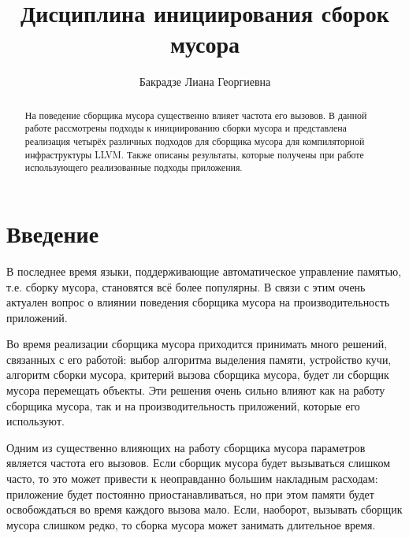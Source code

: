 \title{Дисциплина инициирования сборок мусора}
%
\author{Бакрадзе Лиана Георгиевна}
%
%

%
%

\maketitle              %

\setcounter{algorithm}{0}

\begin{abstract}
На поведение сборщика мусора существенно влияет частота его вызовов. В данной работе рассмотрены подходы 
к инициированию сборки мусора и представлена реализация четырёх различных подходов для сборщика мусора для 
компиляторной инфраструктуры LLVM. Также описаны результаты, которые получены при работе использующего 
реализованные подходы приложения.
\end{abstract}
%

\section*{Введение}

В последнее время языки, поддерживающие автоматическое управление памятью, т.е. сборку 
мусора, становятся всё более популярны. В связи с этим очень актуален вопрос о влиянии
поведения сборщика мусора на производительность приложений.

Во время реализации сборщика мусора приходится принимать много решений,
связанных с его работой: выбор алгоритма выделения памяти, устройство кучи, 
алгоритм сборки мусора, критерий вызова сборщика мусора, будет ли сборщик мусора 
перемещать объекты. Эти решения очень сильно влияют как на работу сборщика мусора, 
так и на
производительность приложений, которые его используют.

Одним из существенно влияющих на работу сборщика мусора параметров
является частота его вызовов. Если 
сборщик мусора будет вызываться слишком часто, то это может привести к неоправданно
большим накладным расходам: приложение будет постоянно приостанавливаться, но при 
этом памяти будет освобождаться во время каждого вызова мало. Если, наоборот, вызывать 
сборщик мусора слишком редко, то сборка мусора может занимать длительное время. 

